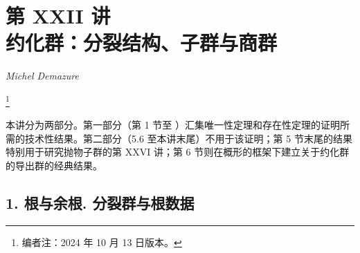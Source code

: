 \setcounter{footnote}{0}
\chapter*{第 XXII 讲\\约化群：分裂结构、子群与商群}
\begin{center}
  \textit{Michel Demazure}
\end{center}

\begingroup
\renewcommand{\thefootnote}{0}
\footnote{编者注：2024 年 10 月 13 日版本。}
\addtocounter{footnote}{-1}
\endgroup
本讲分为两部分。第一部分（第 1 节至 ）汇集唯一性定理和存在性定理的证明所需的技术性结果。第二部分（5.6 至本讲末尾）不用于该证明；第 5 节末尾的结果特别用于研究抛物子群的第 XXVI 讲；第 6 节则在概形的框架下建立关于约化群的导出群的经典结果。

\section*{1. 根与余根. 分裂群与根数据}

